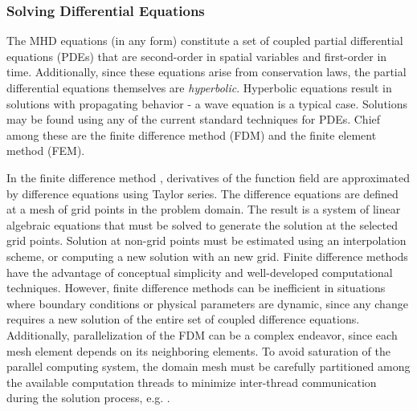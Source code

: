 \documentclass{article}
\begin{document}
\subsubsection{Solving Differential Equations}

The MHD equations (in any form) constitute a set of coupled partial differential equations (PDEs) that are second-order in spatial variables and first-order in time. Additionally, since these equations arise from conservation laws, the partial differential equations themselves are \textit{hyperbolic}. Hyperbolic equations result in solutions with propagating behavior - a wave equation is a typical case. Solutions may be found using any of the current standard techniques for PDEs. Chief among these are the finite difference method (FDM) and the finite element method (FEM).

In the finite difference method \cite{Heath2002}, derivatives of the function field are approximated by difference equations using Taylor series. The difference equations are defined at a mesh of grid points in the problem domain. The result is a system of linear algebraic equations that must be solved to generate the solution at the selected grid points. Solution at non-grid points must be estimated using an interpolation scheme, or computing a new solution with an new grid. Finite difference methods have the advantage of conceptual simplicity and well-developed computational techniques. However, finite difference methods can be inefficient in situations where boundary conditions or physical parameters are dynamic, since any change requires a new solution of the entire set of coupled difference equations. Additionally, parallelization of the FDM can be a complex endeavor, since each mesh element depends on its neighboring elements. To avoid saturation of the parallel computing system, the domain mesh must be carefully partitioned among the available computation threads to minimize inter-thread communication during the solution process, e.g. \cite{Schreiber2017}.
\end{document}
